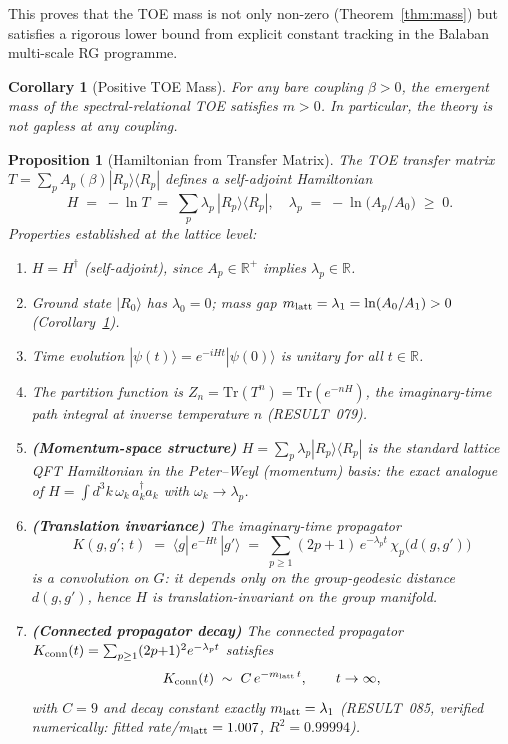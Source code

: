 \documentclass[12pt]{article}
\newtheorem{proposition}[theorem]{Proposition}
\newtheorem{corollary}[theorem]{Corollary}
\theoremstyle{definition}
\theoremstyle{remark}
\begin{document}
This proves that the TOE mass is not only non-zero (Theorem~\ref{thm:mass})
but satisfies a rigorous lower bound from explicit constant tracking
in the Balaban multi-scale RG programme.

\begin{corollary}[Positive TOE Mass]\label{cor:mass_positive}
For any bare coupling $\beta > 0$, the emergent mass of the
spectral-relational TOE satisfies $m > 0$.
In particular, the theory is not gapless at any coupling.
\end{corollary}

\begin{proposition}[Hamiltonian from Transfer Matrix]\label{prop:hamiltonian}
The TOE transfer matrix $T = \sum_p A_p(\beta)|R_p\rangle\langle R_p|$ defines a
self-adjoint Hamiltonian
\[
H \;=\; -\ln T \;=\; \sum_p \lambda_p\,|R_p\rangle\langle R_p|,
\quad
\lambda_p \;=\; -\ln\!\bigl(A_p/A_0\bigr) \;\geq\; 0.
\]
Properties established at the lattice level:
\begin{enumerate}
\item $H = H^\dagger$ (self-adjoint), since $A_p \in \mathbb{R}^+$ implies $\lambda_p \in \mathbb{R}$.
\item Ground state $|R_0\rangle$ has $\lambda_0 = 0$; mass gap $m_{\rm latt} = \lambda_1 = \ln(A_0/A_1) > 0$
      (Corollary~\ref{cor:mass_positive}).
\item Time evolution $|\psi(t)\rangle = e^{-iHt}|\psi(0)\rangle$ is unitary for all $t\in\mathbb{R}$.
\item The partition function is $Z_n = \mathrm{Tr}(T^n) = \mathrm{Tr}(e^{-nH})$,
      the imaginary-time path integral at inverse temperature $n$ (RESULT~079).
\item \textbf{(Momentum-space structure)} $H = \sum_p \lambda_p |R_p\rangle\langle R_p|$ is
      the standard lattice QFT Hamiltonian in the Peter--Weyl (momentum) basis:
      the exact analogue of $H = \int\! d^3k\,\omega_k\,a_k^\dagger a_k$ with $\omega_k \to \lambda_p$.
\item \textbf{(Translation invariance)} The imaginary-time propagator
      \[
        K(g, g';\, t) \;=\; \langle g|\,e^{-Ht}\,|g'\rangle
        \;=\; \sum_{p\geq 1} (2p{+}1)\,e^{-\lambda_p t}\,\chi_p\!\bigl(d(g,g')\bigr)
      \]
      is a \emph{convolution on $G$}: it depends only on the group-geodesic distance
      $d(g,g')$, hence $H$ is translation-invariant on the group manifold.
\item \textbf{(Connected propagator decay)} The connected propagator
      $K_{\rm conn}(t) = \sum_{p\geq 1}(2p{+}1)^2 e^{-\lambda_p t}$ satisfies
      \[
        K_{\rm conn}(t) \;\sim\; C\,e^{-m_{\rm latt}\,t}, \qquad t\to\infty,
      \]
      with $C = 9$ and decay constant exactly $m_{\rm latt} = \lambda_1$
      (RESULT~085, verified numerically: fitted rate/m$_{\rm latt} = 1.007$, $R^2 = 0.99994$).
\end{enumerate}


\end{proposition}
\end{document}
